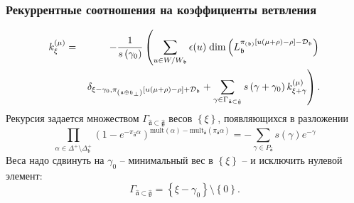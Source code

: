 \documentclass[pdftex]{beamer}
\newcommand{\gfh}{\hat{\mathfrak{g}}}
\newcommand{\afh}{\hat{\mathfrak{a}}}
\theoremstyle{definition} \newtheorem{Def}{Определение}
\begin{document}
\begin{frame}
  \frametitle{Рекуррентные соотношения на коэффициенты ветвления}
  
\begin{eqnarray*}
k_{\xi }^{\left( \mu \right) } &=&-\frac{1}{s\left( \gamma _{0}\right) }%
\left( \sum_{u\in W/W_{\frak{b}}}\epsilon (u)\;\mathrm{dim}\left( L_{\mathfrak{b}}^{\pi
_{\left( \frak{b}\right) }\left[ u(\mu +\rho )-\rho \right] -\mathcal{D}_{%
\frak{b}}}\right) \right.\\
&&\left.\delta _{\xi -\gamma _{0},\pi _{\left( \frak{a\oplus h}%
_{\perp}\right) }\left[ u(\mu +\rho )-\rho \right] +\mathcal{D}_{\frak{b}%
}}+
\sum_{\gamma \in \Gamma _{\afh\subset \gfh}}s\left( \gamma
+\gamma _{0}\right) k_{\xi +\gamma }^{\left( \mu \right) }\right) \text{.}
\end{eqnarray*}
Рекурсия задается множеством $\Gamma _{\afh\subset \gfh}$ весов $\left\{\xi\right\}$, появляющихся в разложении
\begin{equation*}
\prod_{\alpha \in \Delta ^{+}\setminus \Delta _{\mathfrak{b} }^{+}}\left( 1-e^{-\pi
_{\afh}\alpha }\right) ^{\mathrm{mult}(\alpha )-\mathrm{mult}_{\afh}(\pi _{\afh}\alpha )}=-\sum_{\gamma \in P_{\afh}}s(\gamma )e^{-\gamma }
\end{equation*}
Веса надо сдвинуть на  $\gamma _{0}$ -- минимальный вес в  $\left\{ \xi\right\} $ -- и исключить нулевой элемент:
\begin{equation*}
\Gamma _{\afh\subset \gfh}=\left\{ \xi -\gamma
_{0}\right\} \setminus \left\{ 0\right\} .
\end{equation*}
\end{frame}
\end{document}
